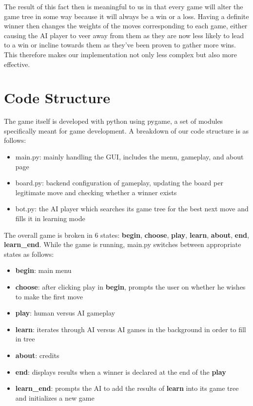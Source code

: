 \documentclass[preprint,12pt]{elsarticle}
\begin{document}
		The result of this fact then is meaningful to us in that every game will alter the game tree in some way because it will always be a win or a loss. Having a definite winner then changes the weights of the moves corresponding to each game, either causing the AI player to veer away from them as they are now less likely to lead to a win or incline towards them as they've been proven to gather more wins. This therefore makes our implementation not only less complex but also more effective.

\section{Code Structure}
	The game itself is developed with python using pygame, a set of modules specifically meant for game development. A breakdown of our code structure is as follows:

	\begin{itemize}
		\item main.py: mainly handling the GUI, includes the menu, gameplay, and about page
		\item board.py: backend configuration of gameplay, updating the board per legitimate move and checking whether a winner exists
		\item bot.py: the AI player which searches its game tree for the best next move and fills it in learning mode
	\end{itemize}

	The overall game is broken in 6 states: \textbf{begin}, \textbf{choose}, \textbf{play}, \textbf{learn}, \textbf{about}, \textbf{end}, \textbf{learn\_end}. While the game is running, main.py switches between appropriate states as follows:

	\begin{itemize}
		\item \textbf{begin}: main menu
		\item \textbf{choose}: after clicking play in \textbf{begin}, prompts the user on whether he wishes to make the first move
		\item \textbf{play}: human versus AI gameplay
		\item \textbf{learn}: iterates through AI versus AI games in the background in order to fill in tree
		\item \textbf{about}: credits
		\item \textbf{end}: displays results when a winner is declared at the end of the \textbf{play}
		\item \textbf{learn\_end}: prompts the AI to add the results of \textbf{learn} into its game tree and initializes a new game
	\end{itemize}
\end{document}
